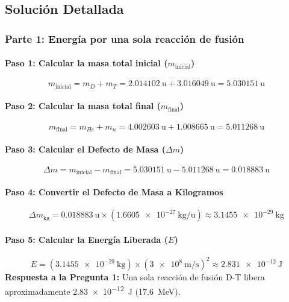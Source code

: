 \documentclass[11pt,a4paper]{article}
\begin{document}
\begin{enumerate}
\subsection*{Solución Detallada}

\subsubsection*{Parte 1: Energía por una sola reacción de fusión}

\paragraph{Paso 1: Calcular la masa total inicial ($m_{\text{inicial}}$)}
\[ m_{\text{inicial}} = m_{D} + m_{T} = \SI{2.014102}{\atomicmassunit} + \SI{3.016049}{\atomicmassunit} = \SI{5.030151}{\atomicmassunit} \]

\paragraph{Paso 2: Calcular la masa total final ($m_{\text{final}}$)}
\[ m_{\text{final}} = m_{He} + m_n = \SI{4.002603}{\atomicmassunit} + \SI{1.008665}{\atomicmassunit} = \SI{5.011268}{\atomicmassunit} \]

\paragraph{Paso 3: Calcular el Defecto de Masa ($\Delta m$)}
\[ \Delta m = m_{\text{inicial}} - m_{\text{final}} = \SI{5.030151}{\atomicmassunit} - \SI{5.011268}{\atomicmassunit} = \SI{0.018883}{\atomicmassunit} \]

\paragraph{Paso 4: Convertir el Defecto de Masa a Kilogramos}
\[ \Delta m_{\text{kg}} = \SI{0.018883}{\atomicmassunit} \times (\SI{1.6605e-27}{\kilo\gram\per\atomicmassunit}) \approx \SI{3.1455e-29}{\kilo\gram} \]

\paragraph{Paso 5: Calcular la Energía Liberada ($E$)}
\[ E = (\SI{3.1455e-29}{\kilo\gram}) \times (\SI{3e8}{\meter\per\second})^2 \approx \SI{2.831e-12}{\joule} \]
\textbf{Respuesta a la Pregunta 1:} Una sola reacción de fusión D-T libera aproximadamente \SI{2.83e-12}{\joule} (\SI{17.6}{\mega\electronvolt}).


\end{enumerate}
\end{document}
